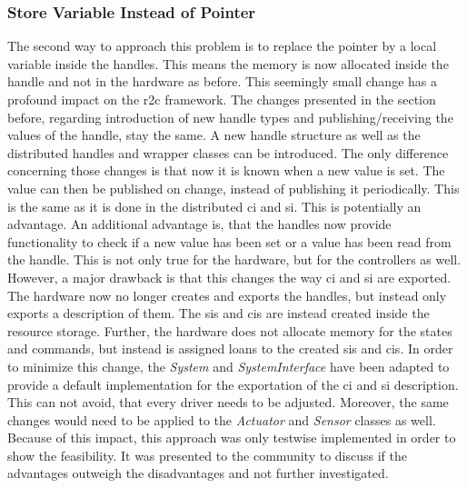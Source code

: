 \subsubsection*{Store Variable Instead of Pointer} 
The second way to approach this problem is to replace the pointer by a local variable inside the \glspl{handle}. This means the memory is now allocated inside the \gls{handle} and not in the hardware as before. This seemingly small change has a profound impact on the \gls{r2c} framework. The changes presented in the section before, regarding introduction of new \gls{handle} types and publishing/receiving the values of the \gls{handle}, stay the same. A new \gls{handle} structure as well as the distributed \glspl{handle} and wrapper classes can be introduced. The only difference concerning those changes is that now it is known when a new value is set. The value can then be published on change, instead of publishing it periodically. This is the same as it is done in the distributed \gls{ci} and \gls{si}. This is potentially an advantage. An additional advantage is, that the \glspl{handle} now provide functionality to check if a new value has been set or a value has been read from the handle. This is not only true for the hardware, but for the controllers as well. \newline
However, a major drawback is that this changes the way \gls{ci} and \gls{si} are exported. The hardware now no longer creates and exports the \glspl{handle}, but instead only exports a description of them. The \glspl{si} and \glspl{ci} are instead created inside the resource storage. Further, the hardware does not allocate memory for the states and commands, but instead is assigned loans to the created \glspl{si} and \glspl{ci}. In order to minimize this change, the \textit{System} and \textit{SystemInterface} have been adapted to provide a default implementation for the exportation of the \gls{ci} and \gls{si} description. This can not avoid, that every driver needs to be adjusted. Moreover, the same changes would need to be applied to the \textit{Actuator} and \textit{Sensor} classes as well. Because of this impact, this approach was only testwise implemented in order to show the feasibility. It was presented to the community to discuss if the advantages outweigh the disadvantages and not further investigated.

